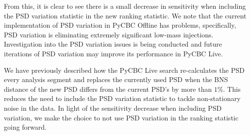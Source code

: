 %
From this, it is clear to see there is a small decrease in sensitivity when including the PSD variation statistic in the new ranking statistic. We note that the current implementation of PSD variation in PyCBC Offline has problems, specifically, PSD variation is eliminating extremely significant low-mass injections. Investigation into the PSD variation issues is being conducted and future iterations of PSD variation may improve its performance in PyCBC Live.

We have previously described how the PyCBC Live search re-calculates the PSD every analysis segment and replaces the currently used PSD when the BNS distance of the new PSD differs from the current PSD's by more than $1\%$. This reduces the need to include the PSD variation statistic to tackle non-stationary noise in the data. In light of the sensitivity decrease when including PSD variation, we make the choice to not use PSD variation in the ranking statistic going forward.

